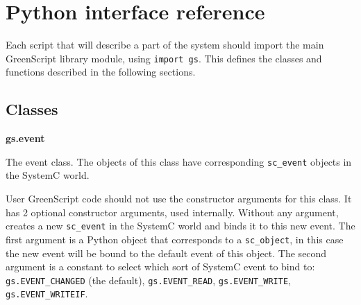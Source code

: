 \documentclass[12pt,oneside]{gsbook}
\begin{document}
\chapter{Python interface reference}
\label{PYTHON}

Each script that will describe a part of the system should import the
main GreenScript library module, using \texttt{import gs}. This
defines the classes and functions described in the following sections.


\section{Classes}

\newcommand{\class}[2]{\par\noindent \textbf{#1}\par\vspace{5pt}\indent\parbox{16.5cm}{#2}\par}
\newenvironment{methods}{\vspace{5pt}\indent Methods:\vspace{10pt}\par\begin{tabular}{@{}p{4cm}p{12cm}}}{\end{tabular}\vspace{25pt}}
\newenvironment{members}{\vspace{5pt}\indent Members:\vspace{10pt}\par\begin{tabular}{@{}p{4cm}p{12cm}}}{\end{tabular}\vspace{25pt}}
\newcommand{\method}[2]{\texttt{#1} & #2 \\}
\newcommand{\member}[2]{\texttt{#1} & #2 \\}



\class {gs.event} { The event class. The objects of this class have
corresponding \texttt{sc\_event} objects in the SystemC world.

User GreenScript code should not use the constructor arguments for
this class.  It has 2 optional constructor arguments, used
internally. Without any argument, creates a new \texttt{sc\_event} in
the SystemC world and binds it to this new event. The first argument
is a Python object that corresponds to a \texttt{sc\_object}, in this
case the new event will be bound to the default event of this
object. The second argument is a constant to select which sort of
SystemC event to bind to: \texttt{gs.EVENT\_CHANGED} (the default),
\texttt{gs.EVENT\_READ}, \texttt{gs.EVENT\_WRITE}, \texttt{gs.EVENT\_WRITEIF}.}
\end{document}
